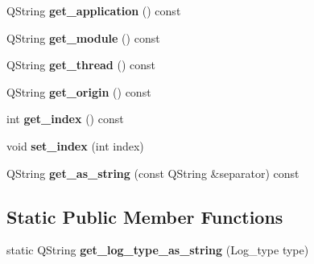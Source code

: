 \begin{DoxyCompactItemize}
\item 
\hypertarget{class_log__viewer_1_1_log__item_a5ea07087e1c69b7b47f9e086c9dc7805}{Q\-String {\bfseries get\-\_\-application} () const }\label{class_log__viewer_1_1_log__item_a5ea07087e1c69b7b47f9e086c9dc7805}

\item 
\hypertarget{class_log__viewer_1_1_log__item_a3d66e3ad889dead96d86d071f8fbb953}{Q\-String {\bfseries get\-\_\-module} () const }\label{class_log__viewer_1_1_log__item_a3d66e3ad889dead96d86d071f8fbb953}

\item 
\hypertarget{class_log__viewer_1_1_log__item_a30e41f8ef5414fea09f3956214fdf847}{Q\-String {\bfseries get\-\_\-thread} () const }\label{class_log__viewer_1_1_log__item_a30e41f8ef5414fea09f3956214fdf847}

\item 
\hypertarget{class_log__viewer_1_1_log__item_a689335f055faa87775bff3a70c684782}{Q\-String {\bfseries get\-\_\-origin} () const }\label{class_log__viewer_1_1_log__item_a689335f055faa87775bff3a70c684782}

\item 
\hypertarget{class_log__viewer_1_1_log__item_a0e4cbe313f42e8b39089a0366211748d}{int {\bfseries get\-\_\-index} () const }\label{class_log__viewer_1_1_log__item_a0e4cbe313f42e8b39089a0366211748d}

\item 
\hypertarget{class_log__viewer_1_1_log__item_a75044accf5b403e2df600b0400f43a19}{void {\bfseries set\-\_\-index} (int index)}\label{class_log__viewer_1_1_log__item_a75044accf5b403e2df600b0400f43a19}

\item 
\hypertarget{class_log__viewer_1_1_log__item_a07cf45b193c545d618a0d31f84589edd}{Q\-String {\bfseries get\-\_\-as\-\_\-string} (const Q\-String \&separator) const }\label{class_log__viewer_1_1_log__item_a07cf45b193c545d618a0d31f84589edd}

\end{DoxyCompactItemize}
\subsection*{Static Public Member Functions}
\begin{DoxyCompactItemize}
\item 
\hypertarget{class_log__viewer_1_1_log__item_a247847a2d6a0c18666a52198e6826752}{static Q\-String {\bfseries get\-\_\-log\-\_\-type\-\_\-as\-\_\-string} (Log\-\_\-type type)}\label{class_log__viewer_1_1_log__item_a247847a2d6a0c18666a52198e6826752}

\end{DoxyCompactItemize}
